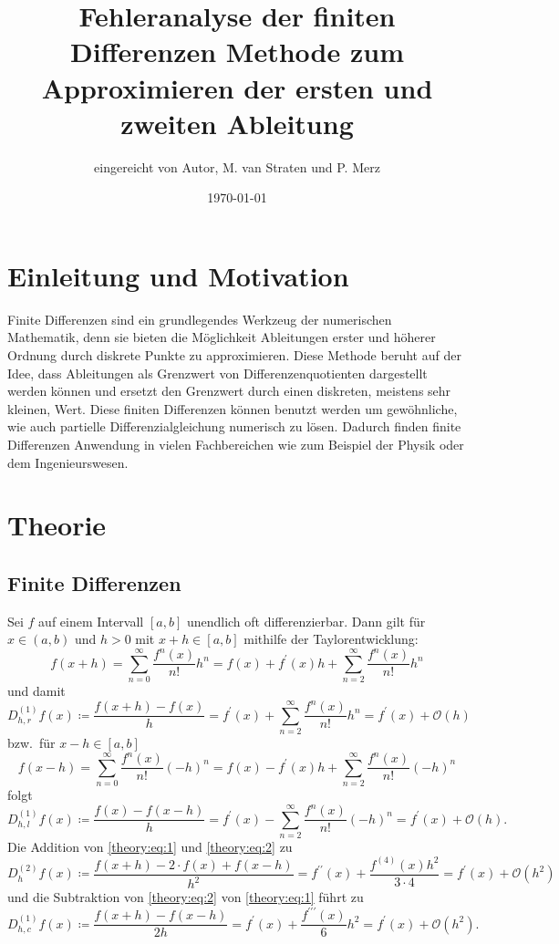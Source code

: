 \documentclass{scrartcl}
\title{Fehleranalyse der finiten Differenzen Methode zum Approximieren der ersten und zweiten Ableitung}
\author{%
  eingereicht von Autor, M. van Straten und P. Merz
}
\date{\today}
\newcommand{\BigO}{\mathcal{O}}
\theoremstyle{remark}
\begin{document}
\maketitle
\tableofcontents
\cleardoublepage%

\section{Einleitung und Motivation}
Finite Differenzen sind ein grundlegendes Werkzeug der numerischen Mathematik,
denn sie bieten die Möglichkeit Ableitungen erster und höherer Ordnung durch
diskrete Punkte zu approximieren. Diese Methode beruht auf der Idee, dass
Ableitungen als Grenzwert von Differenzenquotienten dargestellt werden können
und ersetzt den Grenzwert durch einen diskreten, meistens sehr kleinen, Wert.
Diese finiten Differenzen können benutzt werden um gewöhnliche, wie auch
partielle Differenzialgleichung numerisch zu lösen. Dadurch finden finite
Differenzen Anwendung in vielen Fachbereichen wie zum Beispiel der Physik oder
dem Ingenieurswesen.\ \cite{FiniteDifferenzen}

\section{Theorie}

\subsection{Finite Differenzen} %
Sei \(f\) auf einem Intervall \([a,b]\) unendlich oft differenzierbar. Dann
gilt für \(x \in (a,b)\) und \(h > 0\) mit \(x + h \in [a,b]\) mithilfe der
Taylorentwicklung:
\begin{equation} \label{theory:eq:1}
    f(x + h)
    = \sum_{n=0}^{\infty} \frac{f^n(x)}{n!} h^n
    = f(x) + f^\prime(x) h + \sum_{n=2}^\infty \frac{f^n(x)}{n!} h^n
\end{equation}
und damit
\[
    D_{h, r}^{(1)} f(x)
    \coloneq \frac{f(x + h) - f(x)}{h}
    = f^\prime(x) + \sum_{n=2}^\infty \frac{f^n(x)}{n!} h^n
    = f^\prime(x) + \BigO(h)
\]
bzw.\ für \(x - h \in [a,b]\)
\begin{equation} \label{theory:eq:2}
    f(x - h)
    = \sum_{n=0}^\infty \frac{f^n(x)}{n!} {(-h)}^n
    = f(x) - f^{\prime}(x)h + \sum_{n=2}^\infty \frac{f^n(x)}{n!} {(-h)}^n
\end{equation}
folgt
\[
    D_{h, l}^{(1)} f(x)
    \coloneq \frac{f(x) - f(x - h)}{h}
    = f^\prime(x) - \sum_{n=2}^\infty \frac{f^n(x)}{n!} {(-h)}^n
    = f^\prime(x) + \BigO(h).
\]
Die Addition von \autoref{theory:eq:1} und \autoref{theory:eq:2} zu
\[
    D_h^{(2)} f(x)
    \coloneq \frac{f(x + h) - 2 \cdot f(x) + f(x - h)}{h^2}
    = f^{\prime\prime}(x) + \frac{f^{(4)}(x) h^2}{3 \cdot 4}
    = f^\prime(x) + \BigO(h^2)
\]
und die Subtraktion von \autoref{theory:eq:2} von \autoref{theory:eq:1} führt
  zu
\[
    D_{h, c}^{(1)} f(x)
    \coloneq \frac{f(x + h) - f(x - h)}{2h}
    = f^\prime(x) + \frac{f^{\prime\prime\prime}(x)}{6} h^2
    = f^\prime(x) + \BigO(h^2).
\]~\cite{NumericalDifferentiation}
\end{document}
